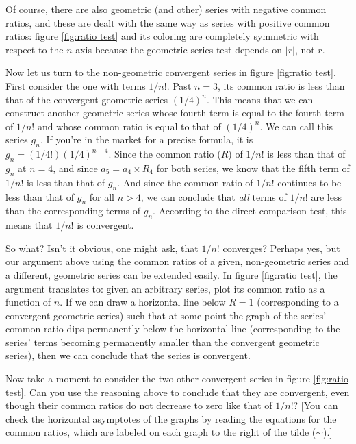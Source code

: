 \documentclass{myarticle}
\theoremstyle{nospace}
\newtheorem{old series theorem}{Theorem}
\newenvironment{series theorem}{\begin{mdframed}\begin{old series theorem}}{\end{old series theorem}\end{mdframed}}
\begin{document}
Of course, there are also geometric (and other) series with negative common ratios, and these are dealt with the same way as series with positive common ratios: figure \ref{fig:ratio test} and its coloring are completely symmetric with respect to the $n$-axis because the geometric series test depends on $|r|$, not $r$.

Now let us turn to the non-geometric \textcolor{nicegreen}{convergent} series in figure \ref{fig:ratio test}. First consider the one with terms \textcolor{nicegreen}{$1/n!$}. Past $n = 3$, its common ratio is less than that of the convergent geometric series \textcolor{nicegreen}{$(1/4)^n$}. This means that we can construct another geometric series whose fourth term is equal to the fourth term of \textcolor{nicegreen}{$1/n!$} and whose common ratio is equal to that of \textcolor{nicegreen}{$(1/4)^n$}. We can call this series \textcolor{nicegreen}{$g_n$}. If you're in the market for a precise formula, it is \textcolor{nicegreen}{$g_n = (1/4!)(1/4)^{n-4}$}. Since the common ratio ($R$) of \textcolor{nicegreen}{$1/n!$} is less than that of \textcolor{nicegreen}{$g_n$} at $n = 4$, and since $a_5 = a_4 \times R_4$ for both series, we know that the fifth term of \textcolor{nicegreen}{$1/n!$} is less than that of \textcolor{nicegreen}{$g_n$}. And since the common ratio of \textcolor{nicegreen}{$1/n!$} continues to be less than that of \textcolor{nicegreen}{$g_n$} for all $n > 4$, we can conclude that \emph{all} terms of \textcolor{nicegreen}{$1/n!$} are less than the corresponding terms of \textcolor{nicegreen}{$g_n$}. According to the direct comparison test, this means that \textcolor{nicegreen}{$1/n!$} is convergent.

So what? Isn't it obvious, one might ask, that \textcolor{nicegreen}{$1/n!$} converges? Perhaps yes, but our argument above using the common ratios of a given, non-geometric series and a different, geometric series can be extended easily. In figure \ref{fig:ratio test}, the argument translates to: given an arbitrary series, plot its common ratio as a function of $n$. If we can draw a horizontal line below $R = 1$ (corresponding to a \textcolor{nicegreen}{convergent} geometric series) such that at some point the graph of the series' common ratio dips permanently below the horizontal line (corresponding to the series' terms becoming permanently smaller than the \textcolor{nicegreen}{convergent} geometric series), then we can conclude that the series is \textcolor{nicegreen}{convergent}.

Now take a moment to consider the two other \textcolor{nicegreen}{convergent} series in figure \ref{fig:ratio test}. Can you use the reasoning above to conclude that they are \textcolor{nicegreen}{convergent}, even though their common ratios do not decrease to zero like that of \textcolor{nicegreen}{$1/n!$}? [You can check the horizontal asymptotes of the graphs by reading the equations for the common ratios, which are labeled on each graph to the right of the tilde ($\sim$).]
\end{document}
